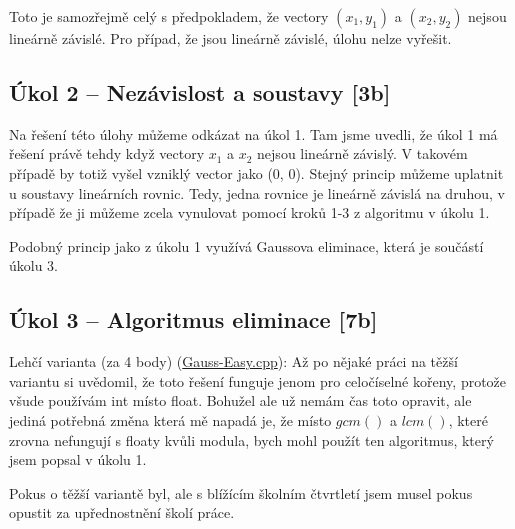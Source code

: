 \documentclass[12pt]{article}
\begin{document}
Toto je samozřejmě celý s předpokladem, že vectory $(x_1, y_1)$ a $(x_2, y_2)$ nejsou lineárně závislé.
Pro případ, že jsou lineárně závislé, úlohu nelze vyřešit.

\subsection*{Úkol 2 – Nezávislost a soustavy [3b]}

Na řešení této úlohy můžeme odkázat na úkol 1.
Tam jsme uvedli, že úkol 1 má řešení právě tehdy když vectory \textbf{$x_1$} a \textbf{$x_2$} nejsou lineárně závislý.
V takovém případě by totiž vyšel vzniklý vector jako (0, 0).
Stejný princip můžeme uplatnit u soustavy lineárních rovnic.
Tedy, jedna rovnice je lineárně závislá na druhou,
v případě že ji můžeme zcela vynulovat pomocí kroků 1-3 z algoritmu v úkolu 1.

Podobný princip jako z úkolu 1 využívá Gaussova eliminace, která je součástí úkolu 3.

\subsection*{Úkol 3 – Algoritmus eliminace [7b]}

Lehčí varianta (za 4 body) (\href{run:./Gauss-Easy.cpp}{Gauss-Easy.cpp}):
Až po nějaké práci na těžší variantu si uvědomil, že toto řešení funguje jenom pro celočíselné kořeny,
protože všude používám int místo float. Bohužel ale už nemám čas toto opravit, ale jediná potřebná změna která mě napadá je,
že místo $gcm()$ a $lcm()$, které zrovna nefungují s floaty kvůli modula, bych mohl použít ten algoritmus, který jsem popsal v úkolu 1.

Pokus o těžší variantě byl, ale s blížícím školním čtvrtletí jsem musel pokus opustit za upřednostnění školí práce.

\end{document}
